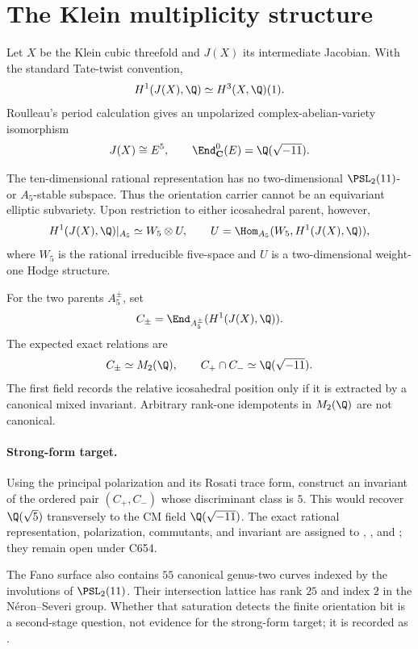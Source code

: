 \section{The Klein multiplicity structure}
\label{sec:klein}

Let \(X\) be the Klein cubic threefold and \(J(X)\) its intermediate
Jacobian.  With the standard Tate-twist convention,
\[
 H^1(J(X),\Q)\simeq H^3(X,\Q)(1).
\]
Roulleau's period calculation \cite{RoulleauKlein} gives an unpolarized complex-abelian-variety
isomorphism
\[
 J(X)\cong E^5,\qquad
 \End_{\mathbf C}^0(E)=\Q(\sqrt{-11}).
\]

The ten-dimensional rational representation has no two-dimensional
\(\PSL_2(11)\)- or \(A_5\)-stable subspace.  Thus the orientation carrier
cannot be an equivariant elliptic subvariety.  Upon restriction to either
icosahedral parent, however,
\[
 H^1(J(X),\Q)|_{A_5}\simeq W_5\otimes U,
\qquad
 U=\Hom_{A_5}(W_5,H^1(J(X),\Q)),
\]
where \(W_5\) is the rational irreducible five-space and \(U\) is a
two-dimensional weight-one Hodge structure.

For the two parents \(A_5^\pm\), set
\[
 C_\pm=\End_{A_5^\pm}(H^1(J(X),\Q)).
\]
The expected exact relations are
\[
 C_\pm\simeq M_2(\Q),\qquad
 C_+\cap C_-\simeq\Q(\sqrt{-11}).
\]
The first field records the relative icosahedral position only if it is
extracted by a canonical mixed invariant.  Arbitrary rank-one idempotents
in \(M_2(\Q)\) are not canonical.

\paragraph{Strong-form target.}
Using the principal polarization and its Rosati trace form, construct an
invariant of the ordered pair \((C_+,C_-)\) whose discriminant class is
\(5\).  This would recover \(\Q(\sqrt5)\) transversely to the CM field
\(\Q(\sqrt{-11})\).  The exact rational representation, polarization,
commutants, and invariant are assigned to ,
, and ; they remain open under C654.

The Fano surface also contains \(55\) canonical genus-two curves
\cite{RoulleauCurves} indexed by
the involutions of \(\PSL_2(11)\).  Their intersection lattice has rank
\(25\) and index \(2\) in the Néron--Severi group.  Whether that saturation
detects the finite orientation bit is a second-stage question, not evidence
for the strong-form target; it is recorded as .
